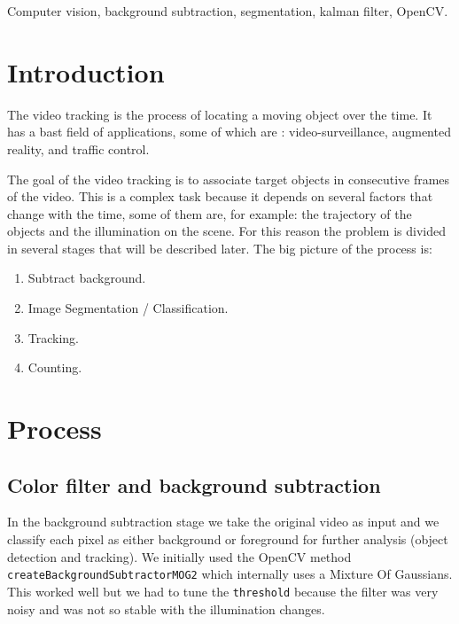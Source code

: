 \documentclass[journal]{IEEEtran}
\begin{document}
\begin{IEEEkeywords}
Computer vision, background subtraction, segmentation, kalman filter, OpenCV.
\end{IEEEkeywords}

\section{Introduction}


The video tracking is the process of locating a moving object over the time.
It has a bast field of applications, some of which are \cite{wiki:tracking}:
video-surveillance, augmented reality, and traffic control.

The goal of the video tracking is to associate target objects in consecutive
frames of the video. This is a complex task because it depends on several
factors that change with the time, some of them are, for example:
the trajectory of the objects and the illumination on the scene. For this
reason the problem is divided in several stages that will be described later.
The big picture of the process is:

\begin{enumerate}
  \item Subtract background.
  \item Image Segmentation / Classification.
  \item Tracking.
  \item Counting.
\end{enumerate}


\section{Process}

\subsection{Color filter and background subtraction}

In the background subtraction stage we take the original video as input and
we classify each pixel as either background or foreground for further analysis
(object detection and tracking). We initially used the OpenCV method
\texttt{createBackgroundSubtractorMOG2} which internally uses a Mixture Of
Gaussians. This worked well but we had to tune the \texttt{threshold} because
the filter was very noisy and was not so stable with the illumination changes.
\end{document}
